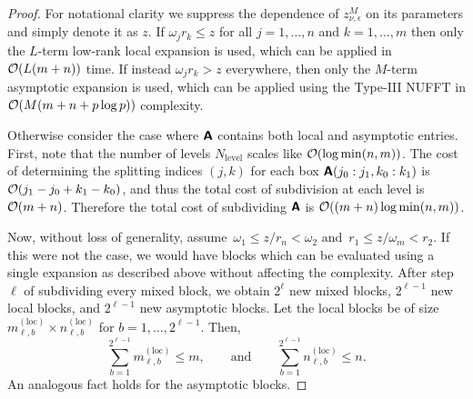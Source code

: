 \begin{proof}
    For notational clarity we suppress the dependence of $z_{\nu, \epsilon}^M$
    on its parameters and simply denote it as $z$. If $\omega_j r_k \leq z$ for
    all $j=1,\dots,n$ and $k=1,\dots,m$ then only the $L$-term low-rank local
    expansion is used, which can be applied in $\mathcal{O}(L(m + n))$ time. If instead
    $\omega_j r_k > z$ everywhere, then only the $M$-term asymptotic expansion
    is used, which can be applied using the Type-III NUFFT in $\mathcal{O}(M(m + n +
    p\log p))$ complexity.

    Otherwise consider the case where $\bm{\mathsf{A}}$ contains both local and
    asymptotic entries. First, note that the number of levels $N_{\text{level}}$
    scales like $\mathcal{O}(\log\min(n,m))$. The cost of determining the splitting
    indices $(j,k)$ for each box $\bm{\mathsf{A}}(j_0:j_1,k_0:k_1)$
    is~${\mathcal{O}(j_1-j_0+k_1-k_0)}$, and thus the total cost of subdivision at each
    level is $\mathcal{O}(m+n)$. Therefore the total cost of subdividing $\bm{\mathsf{A}}$ is
    $\mathcal{O}((m+n)\log\min(n,m))$.
    
    Now, without loss of generality, assume~$\omega_1 \leq z/r_n < \omega_2$
     and~$r_1 \leq z/\omega_m < r_2$. If this were not the case, we would have
     blocks which can be evaluated using a single expansion as described above
     without affecting the complexity. After step~$\ell$ of subdividing every
     mixed block, we obtain $2^{\ell}$ new mixed blocks, $2^{\ell-1}$ new local
     blocks, and $2^{\ell-1}$ new asymptotic blocks. Let the local blocks be of
     size $m_{\ell,b}^{(\text{loc})} \times n_{\ell,b}^{(\text{loc})}$ for $b =
     1,\dots,2^{\ell-1}$. Then,
    \begin{equation}
      \sum_{b=1}^{2^{\ell-1}} m_{\ell,b}^{(\text{loc})} \leq m, \qquad
      \text{and} \qquad
      \sum_{b=1}^{2^{\ell-1}} n_{\ell,b}^{(\text{loc})} \leq n.
    \end{equation}
    An analogous fact holds for the asymptotic blocks.
    

\end{proof}
